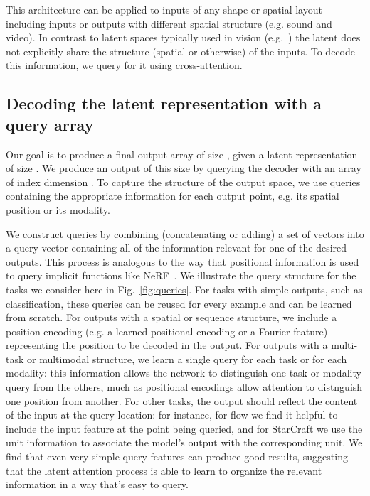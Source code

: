 \documentclass{article} \usepackage{iclr2022_conference,times}
\begin{document}
This architecture can be applied to inputs of any shape or spatial layout including inputs or outputs with different spatial structure (e.g. sound and video). In contrast to latent spaces typically used in vision (e.g.~\citealt{ronnenberger2015convolutional}) the latent does not explicitly share the structure (spatial or otherwise) of the inputs. To decode this information, we query for it using cross-attention.

\subsection{Decoding the latent representation with a query array}
\label{sec:decode}

Our goal is to produce a final output array of size , given a latent representation of size . We produce an output of this size by querying the decoder with an array of index dimension . To capture the structure of the output space, we use queries containing the appropriate information for each output point, e.g. its spatial position or its modality.

We construct queries by combining (concatenating or adding) a set of vectors into a query vector containing all of the information relevant for one of the  desired outputs. This process is analogous to the way that positional information is used to query implicit functions like NeRF~\citep{mildenhall2020nerf}. We illustrate the query structure for the tasks we consider here in Fig.~\ref{fig:queries}. For tasks with simple outputs, such as classification, these queries can be reused for every example and can be learned from scratch. For outputs with a spatial or sequence structure, we include a position encoding (e.g. a learned positional encoding or a Fourier feature) representing the position to be decoded in the output. For outputs with a multi-task or multimodal structure, we learn a single query for each task or for each modality: this information allows the network to distinguish one task or modality query from the others, much as positional encodings allow attention to distnguish one position from another. For other tasks, the output should reflect the content of the input at the query location: for instance, for flow we find it helpful to include the input feature at the point being queried, and for StarCraft  we use the unit information to associate the model's output with the corresponding unit. We find that even very simple query features can produce good results, suggesting that the latent attention process is able to learn to organize the relevant information in a way that's easy to query.
\end{document}
